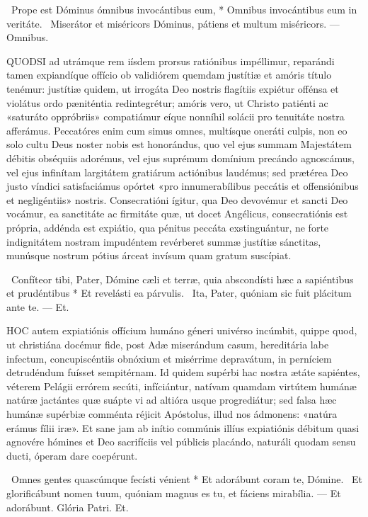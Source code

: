 \R\ Prope est Dóminus ómnibus invocántibus eum, * Omnibus invocántibus eum in veritáte. \V\ Miserátor et miséricors Dóminus, pátiens et multum miséricors. --- Omnibus.


\lettrine[lines=2]{Q}{UODSI} ad utrámque rem iísdem prorsus ratiónibus impéllimur, reparándi tamen expiandíque offício ob validiórem quemdam justítiæ et amóris título tenémur: justítiæ quidem, ut irrogáta Deo nostris flagítiis expiétur offénsa et violátus ordo pæniténtia redintegrétur; amóris vero, ut Christo patiénti ac «saturáto oppróbriis» compatiámur eíque nonníhil solácii pro tenuitáte nostra afferámus. Peccatóres enim cum simus omnes, multísque oneráti culpis, non eo solo cultu Deus noster nobis est honorándus, quo vel ejus summam Majestátem débitis obséquiis adorémus, vel ejus suprémum domínium precándo agnoscámus, vel ejus infinítam largitátem gratiárum actiónibus laudémus; sed prætérea Deo justo víndici satisfaciámus opórtet «pro innumerabílibus peccátis et offensiónibus et negligéntiis» nostris. Consecratióni ígitur, qua Deo devovémur et sancti Deo vocámur, ea sanctitáte ac firmitáte quæ, ut docet Angélicus, consecratiónis est própria, addénda est expiátio, qua pénitus peccáta exstinguántur, ne forte indignitátem nostram impudéntem revérberet summæ justítiæ sánctitas, munúsque nostrum pótius árceat invísum quam gratum suscípiat.

\R\ Confíteor tibi, Pater, Dómine cæli et terræ, quia abscondísti hæc a sapiéntibus et prudéntibus * Et revelásti ea párvulis. \V\ Ita, Pater, quóniam sic fuit plácitum ante te. --- Et.


\lettrine[lines=2]{H}{OC} autem expiatiónis offícium humáno géneri univérso incúmbit, quippe quod, ut christiána docémur fide, post Adæ miserándum casum, hereditária labe infectum, concupiscéntiis obnóxium et misérrime depravátum, in perníciem detrudéndum fuísset sempitérnam. Id quidem supérbi hac nostra ætáte sapiéntes, véterem Pelágii errórem secúti, infíciántur, natívam quamdam virtútem humánæ natúræ jactántes quæ suápte vi ad altióra usque progrediátur; sed falsa hæc humánæ supérbiæ comménta réjicit Apóstolus, illud nos ádmonens: «natúra erámus fílii iræ». Et sane jam ab inítio commúnis illíus expiatiónis débitum quasi agnovére hómines et Deo sacrifíciis vel públicis placándo, naturáli quodam sensu ducti, óperam dare coepérunt.

\R\ Omnes gentes quascúmque fecísti vénient * Et adorábunt coram te, Dómine. \V\ Et glorificábunt nomen tuum, quóniam magnus es tu, et fáciens mirabília. --- Et adorábunt. Glória Patri. Et.

